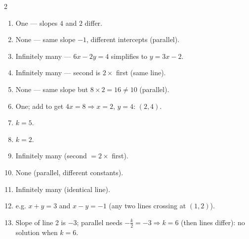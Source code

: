 \documentclass[11pt]{article}
\begin{document}
\begin{keybox}
\begin{multicols}{2}
\small
\begin{enumerate}[leftmargin=*,itemsep=3pt]
  \item One --- slopes $4$ and $2$ differ.
  \item None --- same slope $-1$, different intercepts (parallel).
  \item Infinitely many --- $6x-2y=4$ simplifies to $y=3x-2$.
  \item Infinitely many --- second is $2\times$ first (same line).
  \item None --- same slope but $8\times2=16\neq10$ (parallel).
  \item One; add to get $4x=8\Rightarrow x=2$, $y=4$: $(2,4)$.
  \item $k=5$.
  \item $k=2$.
  \item Infinitely many (second $=2\times$ first).
  \item None (parallel, different constants).
  \item Infinitely many (identical line).
  \item e.g. $x+y=3$ and $x-y=-1$ (any two lines crossing at $(1,2)$).
  \item Slope of line 2 is $-3$; parallel needs $-\tfrac{k}{2}=-3\Rightarrow k=6$ (then lines differ): no solution when $k=6$.
\end{enumerate}
\end{multicols}
\end{keybox}
\end{document}
